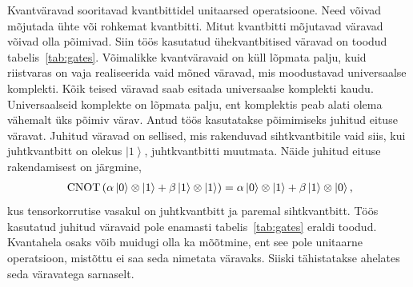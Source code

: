\documentclass[12pt]{report}
\def\paren#1{\left(#1\right)}
\def\ket#1{\left|#1\right>}
\def\CNOT{\mathop{\rm CNOT}\nolimits}
\begin{document}
Kvantväravad sooritavad kvantbittidel unitaarsed operatsioone.
Need võivad mõjutada ühte või rohkemat kvantbitti.
Mitut kvantbitti mõjutavad väravad võivad olla põimivad.
Siin töös kasutatud ühekvantbitised väravad on toodud tabelis~\ref{tab:gates}.
Võimalikke kvantväravaid on küll lõpmata palju, kuid riistvaras on vaja realiseerida vaid mõned väravad, mis moodustavad universaalse komplekti.
Kõik teised väravad saab esitada universaalse komplekti kaudu.
Universaalseid komplekte on lõpmata palju, ent komplektis peab alati olema vähemalt üks põimiv värav.
Antud töös kasutatakse põimimiseks juhitud eituse väravat.
Juhitud väravad on sellised, mis rakenduvad sihtkvantbitile vaid siis, kui juhtkvantbitt on olekus \(\ket1\), juhtkvantbitti muutmata.
Näide juhitud eituse rakendamisest on järgmine,
\begin{align}
    \CNOT \paren{\alpha \ket{0} \otimes \ket{1} + \beta \ket{1} \otimes \ket{1}}
    = \alpha \ket{0} \otimes \ket{1} + \beta \ket{1} \otimes \ket{0} \rlap{,}
\end{align}
kus tensorkorrutise vasakul on juhtkvantbitt ja paremal sihtkvantbitt.
Töös kasutatud juhitud väravaid pole enamasti tabelis~\ref{tab:gates} eraldi toodud.
Kvantahela osaks võib muidugi olla ka mõõtmine, ent see pole unitaarne operatsioon, mistõttu ei saa seda nimetata väravaks.
Siiski tähistatakse ahelates seda väravatega sarnaselt.
\end{document}
